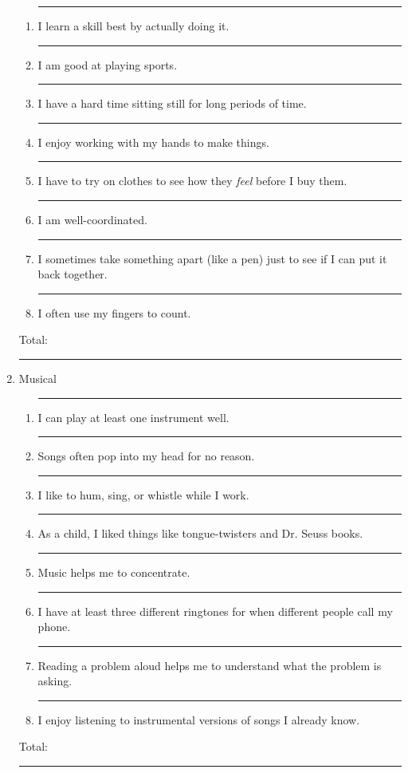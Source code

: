\documentclass[letterpaper, 11pt]{article}
\begin{document}
\begin{enumerate}
\begin{enumerate}
	\item \rule{.5in}{.01in} I learn a skill best by actually doing it.
	\item \rule{.5in}{.01in} I am good at playing sports.
	\item \rule{.5in}{.01in} I have a hard time sitting still for long periods of time.
	\item \rule{.5in}{.01in} I enjoy working with my hands to make things.
	\item \rule{.5in}{.01in} I have to try on clothes to see how they \textit{feel} before I buy them.
	\item \rule{.5in}{.01in} I am well-coordinated.
	\item \rule{.5in}{.01in} I sometimes take something apart (like a pen) just to see if I can put it back together.
	\item \rule{.5in}{.01in} I often use my fingers to count.
\end{enumerate}
Total:  \rule{.5in}{.01in}

\vspace{.1in}

\item Musical
\begin{enumerate}
	\item \rule{.5in}{.01in} I can play at least one instrument well.
	\item \rule{.5in}{.01in} Songs often pop into my head for no reason.
	\item \rule{.5in}{.01in} I like to hum, sing, or whistle while I work.
	\item \rule{.5in}{.01in} As a child, I liked things like tongue-twisters and Dr. Seuss books.
	\item \rule{.5in}{.01in} Music helps me to concentrate.
	\item \rule{.5in}{.01in} I have at least three different ringtones for when different people call my phone.
	\item \rule{.5in}{.01in} Reading a problem aloud helps me to understand what the problem is asking.
	\item \rule{.5in}{.01in} I enjoy listening to instrumental versions of songs I already know.
\end{enumerate}
Total:  \rule{.5in}{.01in}

\vspace{.1in}


\end{enumerate}
\end{document}
